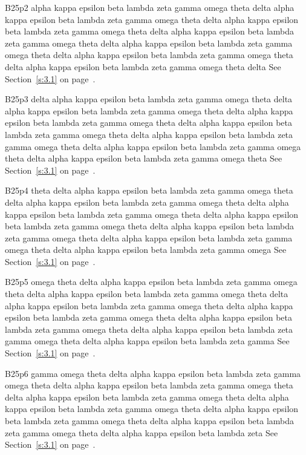 B25p2 alpha kappa epsilon beta lambda zeta gamma omega theta delta alpha kappa epsilon beta lambda zeta gamma omega theta delta alpha kappa epsilon beta lambda zeta gamma omega theta delta alpha kappa epsilon beta lambda zeta gamma omega theta delta alpha kappa epsilon beta lambda zeta gamma omega theta delta alpha kappa epsilon beta lambda zeta gamma omega theta delta alpha kappa epsilon beta lambda zeta gamma omega theta delta See Section~\ref{s:3.1} on page~\pageref{s:3.1}.

B25p3 delta alpha kappa epsilon beta lambda zeta gamma omega theta delta alpha kappa epsilon beta lambda zeta gamma omega theta delta alpha kappa epsilon beta lambda zeta gamma omega theta delta alpha kappa epsilon beta lambda zeta gamma omega theta delta alpha kappa epsilon beta lambda zeta gamma omega theta delta alpha kappa epsilon beta lambda zeta gamma omega theta delta alpha kappa epsilon beta lambda zeta gamma omega theta See Section~\ref{s:3.1} on page~\pageref{s:3.1}.

B25p4 theta delta alpha kappa epsilon beta lambda zeta gamma omega theta delta alpha kappa epsilon beta lambda zeta gamma omega theta delta alpha kappa epsilon beta lambda zeta gamma omega theta delta alpha kappa epsilon beta lambda zeta gamma omega theta delta alpha kappa epsilon beta lambda zeta gamma omega theta delta alpha kappa epsilon beta lambda zeta gamma omega theta delta alpha kappa epsilon beta lambda zeta gamma omega See Section~\ref{s:3.1} on page~\pageref{s:3.1}.

B25p5 omega theta delta alpha kappa epsilon beta lambda zeta gamma omega theta delta alpha kappa epsilon beta lambda zeta gamma omega theta delta alpha kappa epsilon beta lambda zeta gamma omega theta delta alpha kappa epsilon beta lambda zeta gamma omega theta delta alpha kappa epsilon beta lambda zeta gamma omega theta delta alpha kappa epsilon beta lambda zeta gamma omega theta delta alpha kappa epsilon beta lambda zeta gamma See Section~\ref{s:3.1} on page~\pageref{s:3.1}.

B25p6 gamma omega theta delta alpha kappa epsilon beta lambda zeta gamma omega theta delta alpha kappa epsilon beta lambda zeta gamma omega theta delta alpha kappa epsilon beta lambda zeta gamma omega theta delta alpha kappa epsilon beta lambda zeta gamma omega theta delta alpha kappa epsilon beta lambda zeta gamma omega theta delta alpha kappa epsilon beta lambda zeta gamma omega theta delta alpha kappa epsilon beta lambda zeta See Section~\ref{s:3.1} on page~\pageref{s:3.1}.

